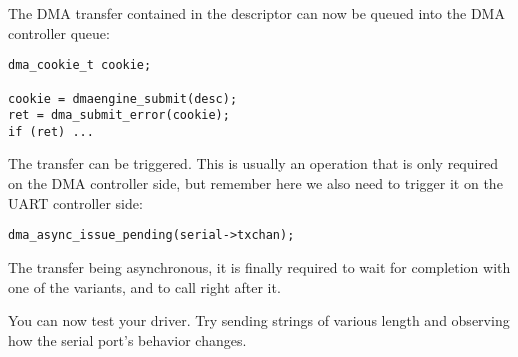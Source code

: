 The DMA transfer contained in the descriptor can now be queued into the DMA
controller queue:

\begin{verbatim}
dma_cookie_t cookie;

cookie = dmaengine_submit(desc);
ret = dma_submit_error(cookie);
if (ret) ...
\end{verbatim}

The transfer can be triggered. This is usually an operation that is only
required on the DMA controller side, but remember here we also need to trigger
it on the UART controller side:

\begin{verbatim}
dma_async_issue_pending(serial->txchan);
\end{verbatim}

The transfer being asynchronous, it is finally required to wait for completion
with one of the  variants, and to call
 right after it.

You can now test your driver. Try sending strings of various length and observing how the serial port's behavior changes.
